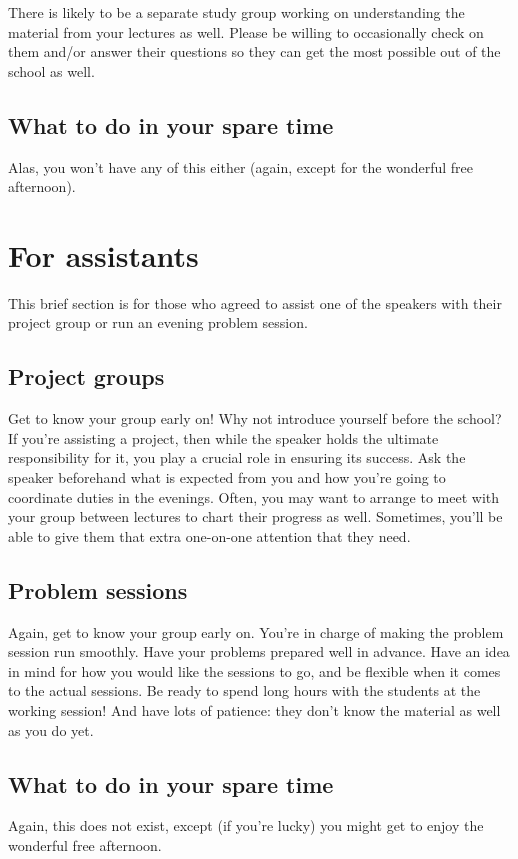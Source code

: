 \documentclass{article}
\begin{document}
There is likely to be a separate study group working on understanding
the material from your lectures as well.  Please be willing to occasionally
check on them and/or answer their questions so they can get the
most possible out of the school as well.

\subsection{What to do in your spare time}
\label{sec:what-do-your-1}
Alas, you won't have any of this either (again, except for the wonderful free afternoon). 

\section{For assistants}
\label{sec:assistants}

This brief section is for those who agreed to assist one of the speakers with their project group
or run an evening problem session.

\subsection{Project groups}
\label{sec:project-groups}
Get to know your group early on!  Why not introduce yourself before the school?
If you're assisting a project, then while the speaker holds the ultimate responsibility
for it, you play a crucial role in ensuring its success.  Ask the speaker beforehand what
is expected from you and how you're going to coordinate duties in the evenings.  Often,
you may want to arrange to meet with your group between lectures to chart their progress
as well.  Sometimes, you'll be able to give them that extra one-on-one attention that they need.

\subsection{Problem sessions}
\label{sec:problem-session}
Again, get to know your group early on.  You're in charge of making the problem session run 
smoothly.   Have your problems prepared well in advance.  Have an idea in mind for how you
would like the sessions to go, and be flexible when it comes to the actual sessions.
Be ready to spend long hours with the students at the working session!  And have lots of patience: 
they don't know the material as well as you do yet.
  
\subsection{What to do in your spare time}
\label{sec:what-do-your-1}
Again, this does not exist, except (if you're lucky) you might get to enjoy the 
wonderful free afternoon. 
\end{document}
